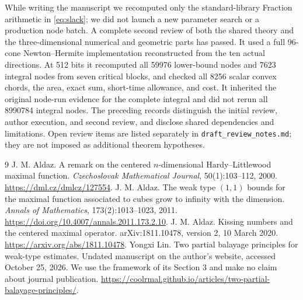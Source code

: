 \documentclass[11pt,a4paper]{article}
\theoremstyle{definition}\newtheorem{definition}[theorem]{Definition}
\theoremstyle{remark}\newtheorem{remark}[theorem]{Remark}
\newcommand{\src}[1]{\nolinkurl{#1}}
\begin{document}
While writing the manuscript we recomputed only the standard-library Fraction arithmetic in \eqref{eq:slack}; we did not launch a new parameter search or a production node batch. A complete second review of both the shared theory and the three-dimensional numerical and geometric parts has passed. It used a full 96-cone Newton--Hermite implementation reconstructed from the ten actual directions. At 512 bits it recomputed all 59976 lower-bound nodes and 7623 integral nodes from seven critical blocks, and checked all 8256 scalar convex chords, the area, exact sum, short-time allowance, and cost. It inherited the original node-run evidence for the complete integral and did not rerun all 8990784 integral nodes. The preceding records distinguish the initial review, author execution, and second review, and disclose shared dependencies and limitations. Open review items are listed separately in \src{draft_review_notes.md}; they are not imposed as additional theorem hypotheses.

\begin{thebibliography}{9}
 J. M. Aldaz.
A remark on the centered $n$-dimensional Hardy--Littlewood maximal function.
\emph{Czechoslovak Mathematical Journal}, 50(1):103--112, 2000.
\url{https://dml.cz/dmlcz/127554}.
 J. M. Aldaz.
The weak type $(1,1)$ bounds for the maximal function associated to cubes grow to infinity with the dimension.
\emph{Annals of Mathematics}, 173(2):1013--1023, 2011.
\url{https://doi.org/10.4007/annals.2011.173.2.10}.
 J. M. Aldaz.
Kissing numbers and the centered maximal operator.
arXiv:1811.10478, version 2, 10 March 2020.
\url{https://arxiv.org/abs/1811.10478}.
 Yongxi Lin.
Two partial balayage principles for weak-type estimates.
Undated manuscript on the author's website, accessed October 25, 2026. We use the framework of its Section 3 and make no claim about journal publication.
\url{https://coolrmal.github.io/articles/two-partial-balayage-principles/}.
\end{thebibliography}
\end{document}
